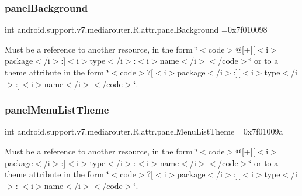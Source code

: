 \subsubsection{\texorpdfstring{panel\+Background}{panelBackground}}
{\footnotesize\ttfamily int android.\+support.\+v7.\+mediarouter.\+R.\+attr.\+panel\+Background =0x7f010098\hspace{0.3cm}{\ttfamily [static]}}

Must be a reference to another resource, in the form \char`\"{}$<$code$>$@\mbox{[}+\mbox{]}\mbox{[}$<$i$>$package$<$/i$>$\+:\mbox{]}$<$i$>$type$<$/i$>$\+:$<$i$>$name$<$/i$>$$<$/code$>$\char`\"{} or to a theme attribute in the form \char`\"{}$<$code$>$?\mbox{[}$<$i$>$package$<$/i$>$\+:\mbox{]}\mbox{[}$<$i$>$type$<$/i$>$\+:\mbox{]}$<$i$>$name$<$/i$>$$<$/code$>$\char`\"{}. \mbox{\label{classandroid_1_1support_1_1v7_1_1mediarouter_1_1R_1_1attr_ab31a72aff48e97ff68184ca0bed5c54d}} 
\subsubsection{\texorpdfstring{panel\+Menu\+List\+Theme}{panelMenuListTheme}}
{\footnotesize\ttfamily int android.\+support.\+v7.\+mediarouter.\+R.\+attr.\+panel\+Menu\+List\+Theme =0x7f01009a\hspace{0.3cm}{\ttfamily [static]}}

Must be a reference to another resource, in the form \char`\"{}$<$code$>$@\mbox{[}+\mbox{]}\mbox{[}$<$i$>$package$<$/i$>$\+:\mbox{]}$<$i$>$type$<$/i$>$\+:$<$i$>$name$<$/i$>$$<$/code$>$\char`\"{} or to a theme attribute in the form \char`\"{}$<$code$>$?\mbox{[}$<$i$>$package$<$/i$>$\+:\mbox{]}\mbox{[}$<$i$>$type$<$/i$>$\+:\mbox{]}$<$i$>$name$<$/i$>$$<$/code$>$\char`\"{}. \mbox{\label{classandroid_1_1support_1_1v7_1_1mediarouter_1_1R_1_1attr_a687e9ffbf613fdf2d33d6a6e2ad23d0e}} 
